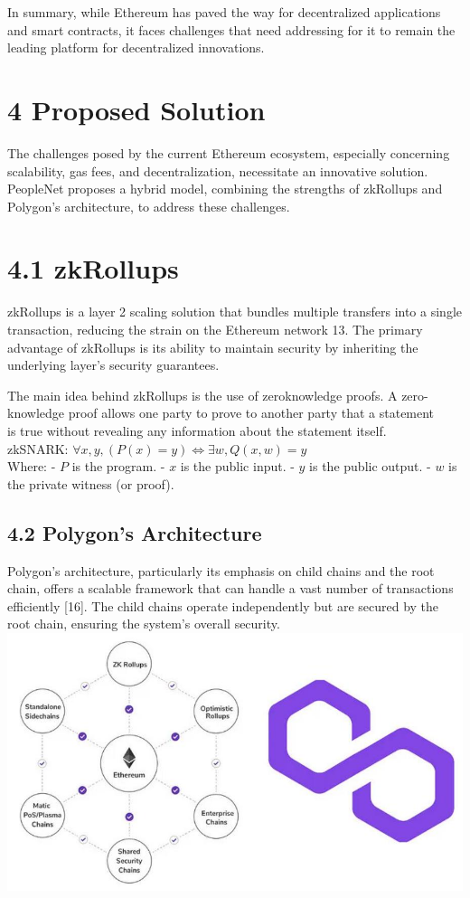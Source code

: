 \documentclass[10pt]{article}
\begin{document}
In summary, while Ethereum has paved the way for decentralized applications and smart contracts, it faces challenges that need addressing for it to remain the leading platform for decentralized innovations.

\section*{4 Proposed Solution}
The challenges posed by the current Ethereum ecosystem, especially concerning scalability, gas fees, and decentralization, necessitate an innovative solution. PeopleNet proposes a hybrid model, combining the strengths of zkRollups and Polygon's architecture, to address these challenges.

\section*{4.1 zkRollups}
zkRollups is a layer 2 scaling solution that bundles multiple transfers into a single transaction, reducing the strain on the Ethereum network 13. The primary advantage of zkRollups is its ability to maintain security by inheriting the underlying layer's security guarantees.

The main idea behind zkRollups is the use of zeroknowledge proofs. A zero-knowledge proof allows one party to prove to another party that a statement\\
is true without revealing any information about the statement itself.\\
zkSNARK: $\forall x, y,(P(x)=y) \Longleftrightarrow \exists w, Q(x, w)=y$\\
Where: - $P$ is the program. - $x$ is the public input. - $y$ is the public output. - $w$ is the private witness (or proof).

\subsection*{4.2 Polygon's Architecture}
Polygon's architecture, particularly its emphasis on child chains and the root chain, offers a scalable framework that can handle a vast number of transactions efficiently [16]. The child chains operate independently but are secured by the root chain, ensuring the system's overall security.\\
\includegraphics[max width=\textwidth, center]{2025_03_06_545dea0014012947d15fg-03}
\end{document}
